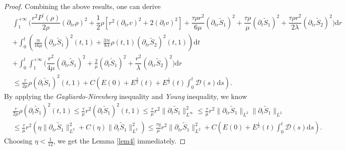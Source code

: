 \documentclass[10pt,a4paper]{amsart}
\begin{document}
\begin{proof}
		Combining the above results, one can derive
		\begin{equation}\label{57}
			\begin{aligned}
				&\int_{1}^{+\infty}\bigg(\dfrac{r^2 P^{\prime}(\rho)}{2\rho} \left(\partial_{tr} \rho\right)^2 +\dfrac{1}{2}\rho\left[r^2 (\partial_{tr}v)^2+2 (\partial_{t}v)^2\right]
				+\dfrac{\tau\rho r^2}{6\mu}  (\partial_{tr}\tilde{S}_1)^2
				+\dfrac{\tau\rho }{\mu} (\partial_{t}\tilde{S}_1)^2
				+\dfrac{\tau\rho r^2}{2\lambda} (\partial_{tr} \tilde{S}_2)^2\bigg)\mathrm{d}r\\
				&+\int_{0}^{t}\left(\frac{\tau\epsilon}{16\mu} (\partial_{tr}\tilde{S}_1)^2(t,1)
				+\frac{3\tau\epsilon}{8\lambda}\rho(t,1)(\partial_{tr}\tilde{S}_2)^2(t,1)\right)\mathrm{d}t\\
				&+\int_{0}^{t}\int_{1}^{+\infty}\bigg(\dfrac{r^2}{4\mu}(\partial_{tr}\tilde{S}_1)^2+\frac{2}{\mu} (\partial_{t}\tilde{S}_1)^2
				+\dfrac{r^2}{\lambda}(\partial_{tr}\tilde{S}_2)^2\bigg)\mathrm{d}r\\
				&\leq \frac{\tau}{2\mu}\rho(\partial_{t}\tilde{S}_1)^2(t,1)+C\left(E(0)+E^{\frac{3}{2}}(t)+ E^{\frac{1}{2}}(t)\int_{0}^{t} \mathcal{D}(s)\mathrm{d}s\right).
			\end{aligned}
		\end{equation}
		By applying the {\it Gagliardo-Nirenberg} inequality and {\it Young} inequality, we know
		\begin{equation}
			\begin{aligned}\nonumber
				&\frac{\tau}{2\mu}\rho(\partial_{t}\tilde{S}_1)^2(t,1)
				\leq \frac{\tau}{\mu}r^2(\partial_{t}\tilde{S}_1)^2(t,1)
				\leq \frac{\tau}{\mu}r^2\|\partial_{t}\tilde{S}_1\|_{L^{\infty}}^2
				\leq\frac{\tau}{\mu}r^2\|\partial_{tr}\tilde{S}_1\|_{L^{2}}\|\partial_{t}\tilde{S}_1\|_{L^{2}}\\
				&\leq \frac{\tau}{\mu}r^2(\eta\|\partial_{tr}\tilde{S}_1\|_{L^{2}}^2+C(\eta)\|\partial_{t}\tilde{S}_1\|_{L^{2}}^2)
				\leq \frac{\tau\eta}{\mu} r^2\|\partial_{tr}\tilde{S}_1\|_{L^{2}}^2
				+C\left(E(0)+E^{\frac{1}{2}}(t) \int_{0}^t \mathcal{D}(s)\mathrm{d}s\right).
			\end{aligned}
		\end{equation}
		Choosing $\eta<\frac{1}{12}$, 
		we get the Lemma \ref{lem4} immediately.
	\end{proof}
\end{document}
